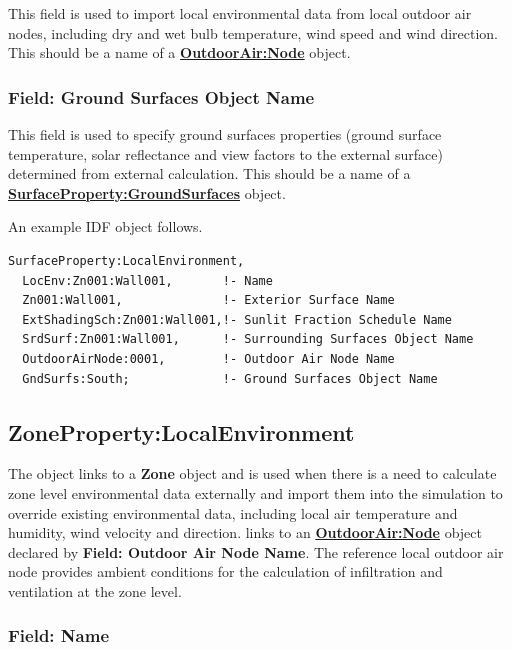 This field is used to import local environmental data from local outdoor air nodes, including dry and wet bulb temperature, wind speed and wind direction. This should be a name of a \textbf{\hyperref[outdoorairnode]{OutdoorAir:Node}} object.

\subsubsection{Field: Ground Surfaces Object Name}\label{field-ground-surfaces-object-name}

This field is used to specify ground surfaces properties (ground surface temperature, solar reflectance and view factors to the external surface) determined from external calculation. This should be a name of a \textbf{\hyperref[surfacePropertyGroundSurfaces]{SurfaceProperty:GroundSurfaces}} object.

An example IDF object follows.

\begin{lstlisting}
SurfaceProperty:LocalEnvironment,
  LocEnv:Zn001:Wall001,       !- Name
  Zn001:Wall001,              !- Exterior Surface Name
  ExtShadingSch:Zn001:Wall001,!- Sunlit Fraction Schedule Name
  SrdSurf:Zn001:Wall001,      !- Surrounding Surfaces Object Name
  OutdoorAirNode:0001,        !- Outdoor Air Node Name
  GndSurfs:South;             !- Ground Surfaces Object Name
\end{lstlisting}

\subsection{ZoneProperty:LocalEnvironment}\label{ZonePropertylocalEnvironment}

The object links to a \textbf{Zone} object and is used when there is a need to calculate zone level environmental data externally and import them into the simulation to override existing environmental data, including local air temperature and humidity, wind velocity and direction. links to an \textbf{\hyperref[outdoorairnode]{OutdoorAir:Node}} object declared by \textbf{Field: Outdoor Air Node Name}. The reference local outdoor air node provides ambient conditions for the calculation of infiltration and ventilation at the zone level.

\subsubsection{Field: Name}\label{field-zone-localenv-name}


